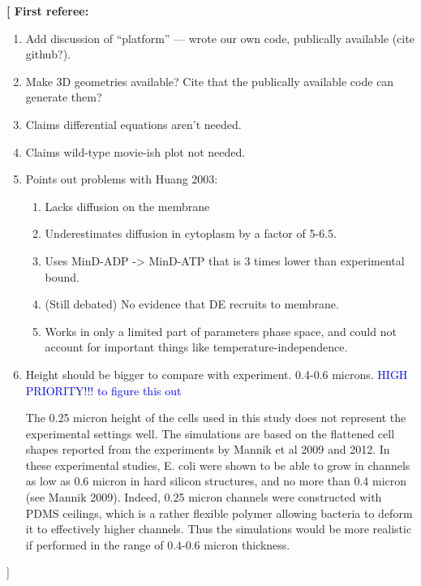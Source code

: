 \documentclass[letterpaper,twocolumn,amsmath,amssymb,pre]{revtex4-1}
\newcommand{\red}[1]{{\bf \color{red} #1}}
\newcommand{\fixme}[1]{\red{[#1]}}
\begin{document}
\fixme{
  First referee:
  \begin{enumerate}
  \item Add discussion of ``platform'' --- wrote our own code,
    publically available (cite github?).
  \item Make 3D geometries available? Cite that the publically
    available code can generate them?
  \item Claims differential equations aren't needed.
  \item Claims wild-type movie-ish plot not needed.
  \item Points out problems with Huang 2003:
    \begin{enumerate}
    \item Lacks diffusion on the membrane
    \item Underestimates diffusion in cytoplasm by a factor of 5-6.5.
    \item Uses MinD-ADP -> MinD-ATP that is 3 times lower than
      experimental bound.
    \item (Still debated) No evidence that DE recruits to membrane.
    \item Works in only a limited part of parameters phase space, and
      could not account for important things like
      temperature-independence.
    \end{enumerate}
  \item Height should be bigger to compare with experiment.  0.4-0.6
    microns.  \textcolor{blue}{HIGH PRIORITY!!! to figure this out}

    The 0.25 micron height of the cells used in this study does not
    represent the experimental settings well. The simulations are
    based on the flattened cell shapes reported from the experiments
    by Mannik et al 2009 and 2012. In these experimental studies,
    E. coli were shown to be able to grow in channels as low as 0.6
    micron in hard silicon structures, and no more than 0.4 micron
    (see Mannik 2009). Indeed, 0.25 micron channels were constructed
    with PDMS ceilings, which is a rather flexible polymer allowing
    bacteria to deform it to effectively higher channels. Thus the
    simulations would be more realistic if performed in the range of
    0.4-0.6 micron thickness.


\end{enumerate}}
\end{document}
